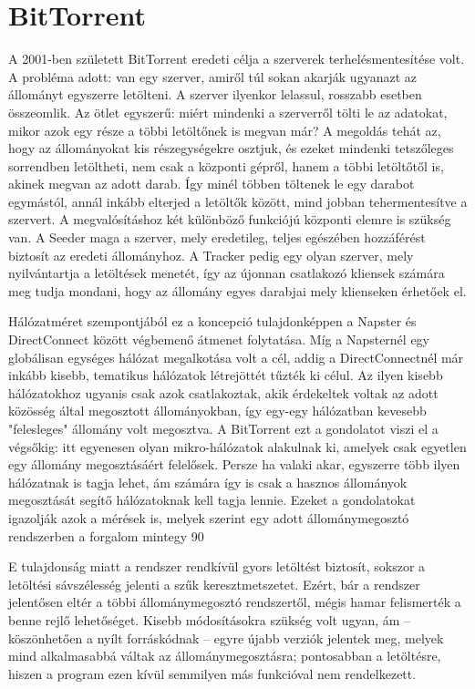 \documentclass[a4paper]{article}
\begin{document}
\section{BitTorrent}
A 2001-ben született BitTorrent eredeti célja a szerverek terhelésmentesítése volt. A probléma adott: van egy szerver, amiről túl sokan akarják ugyanazt az állományt egyszerre letölteni. A szerver ilyenkor lelassul, rosszabb esetben összeomlik. Az ötlet egyszerű: miért mindenki a szerverről tölti le az adatokat, mikor azok egy része a többi letöltőnek is megvan már? A megoldás tehát az, hogy az állományokat kis részegységekre osztjuk, és ezeket mindenki tetszőleges sorrendben letöltheti, nem csak a központi gépről, hanem a többi letöltőtől is, akinek megvan az adott darab. Így minél többen töltenek le egy darabot egymástól, annál inkább elterjed a letöltők között, mind jobban tehermentesítve a szervert. A megvalósításhoz két különböző funkciójú központi elemre is szükség van. A Seeder maga a szerver, mely eredetileg, teljes egészében hozzáférést biztosít az eredeti állományhoz. A Tracker pedig egy olyan szerver, mely nyilvántartja a letöltések menetét, így az újonnan csatlakozó kliensek számára meg tudja mondani, hogy az állomány egyes darabjai mely klienseken érhetőek el.

Hálózatméret szempontjából ez a koncepció tulajdonképpen a Napster és DirectConnect között végbemenő átmenet folytatása. Míg a Napsternél egy globálisan egységes hálózat megalkotása volt a cél, addig a DirectConnectnél már inkább kisebb, tematikus hálózatok létrejöttét tűzték ki célul. Az ilyen kisebb hálózatokhoz ugyanis csak azok csatlakoztak, akik érdekeltek voltak az adott közösség által megosztott állományokban, így egy-egy hálózatban kevesebb "felesleges" állomány volt megosztva. A BitTorrent ezt a gondolatot viszi el a végsőkig: itt egyenesen olyan mikro-hálózatok alakulnak ki, amelyek csak egyetlen egy állomány megosztásáért felelősek. Persze ha valaki akar, egyszerre több ilyen hálózatnak is tagja lehet, ám számára így is csak a hasznos állományok megosztását segítő hálózatoknak kell tagja lennie. Ezeket a gondolatokat igazolják azok a mérések is, melyek szerint egy adott állománymegosztó rendszerben a forgalom mintegy 90%

E tulajdonság miatt a rendszer rendkívül gyors letöltést biztosít, sokszor a letöltési sávszélesség jelenti a szűk keresztmetszetet. Ezért, bár a rendszer jelentősen eltér a többi állománymegosztó rendszertől, mégis hamar felismerték a benne rejlő lehetőséget. Kisebb módosításokra szükség volt ugyan, ám – köszönhetően a nyílt forráskódnak – egyre újabb verziók jelentek meg, melyek mind alkalmasabbá váltak az állománymegosztásra; pontosabban a letöltésre, hiszen a program ezen kívül semmilyen más funkcióval nem rendelkezett.
\end{document}
